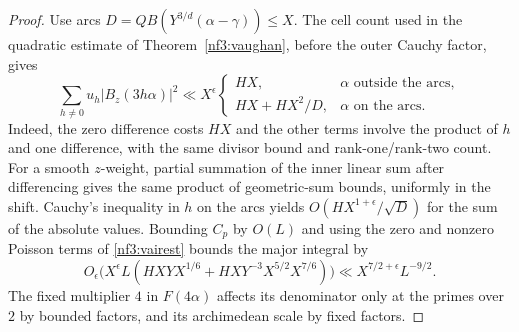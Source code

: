 \documentclass[11pt,letterpaper]{article}
\theoremstyle{definition}
\numberwithin{equation}{section}
\begin{document}
\begin{proof}
Use arcs $D=Q B(Y^{3/d}(\alpha-\gamma))\le X$. The cell count used
in the quadratic estimate of Theorem~\ref{nf3:vaughan}, before the
outer Cauchy factor, gives
\[
 \sum_{h\ne0}u_h |B_z(3h\alpha)|^2
 \ll X^\epsilon
 \begin{cases}
 HX,&\alpha\text{ outside the arcs},\\
 H X+H X^2/D,&\alpha\text{ on the arcs}.
 \end{cases}
\]
Indeed, the zero difference costs $HX$ and the other terms involve
the product of $h$ and one difference, with the same divisor bound
and rank-one/rank-two count. For a smooth $z$-weight, partial
summation of the inner linear sum after differencing gives the same
product of geometric-sum bounds, uniformly in the shift. Cauchy's
inequality in $h$ on the arcs yields $O(H X^{1+\epsilon}/\sqrt D)$
for the sum of the absolute values. Bounding $C_p$ by $O(L)$ and
using the zero and nonzero Poisson terms of \eqref{nf3:vairest}
bounds the major integral by
\[
      O_\epsilon\bigl(X^\epsilon L(HXYX^{1/6}
                      + HXY^{-3}X^{5/2}X^{7/6})\bigr)
       \ll X^{7/2+\epsilon}L^{-9/2}.
\]
The fixed multiplier $4$ in $F(4\alpha)$ affects its denominator only
at the primes over $2$ by bounded factors, and its archimedean scale
by fixed factors.


\end{proof}
\end{document}
